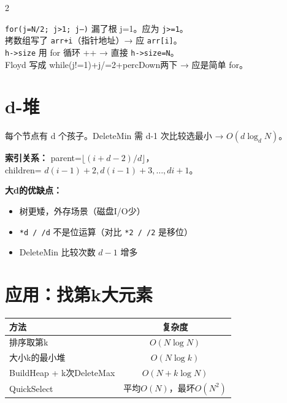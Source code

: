 \documentclass[10pt,a4paper]{article}
\begin{document}
\begin{multicols}{2}
\begin{bugbox}
\texttt{for(j=N/2; j>1; j--)} 漏了根 j=1。应为 \texttt{j>=1}。\\
拷数组写了 \texttt{arr+i}（指针地址）→ 应 \texttt{arr[i]}。\\
\texttt{h->size} 用 for 循环 ++ → 直接 \texttt{h->size=N}。\\
Floyd 写成 while(j!=1)+j/=2+percDown两下 → 应是简单 for。
\end{bugbox}

\section*{d-堆}

每个节点有 d 个孩子。DeleteMin 需 d-1 次比较选最小 → $O(d\log_d N)$。

\textbf{索引关系：} parent=$\lfloor(i+d-2)/d\rfloor$，\\
children= $d(i-1)+2, d(i-1)+3, \dots, di+1$。

\textbf{大d的优缺点：}
\begin{itemize}
\item [+] 树更矮，外存场景（磁盘I/O少）
\item [--] \texttt{*d / /d} 不是位运算（对比 \texttt{*2 / /2} 是移位）
\item [--] DeleteMin 比较次数 $d-1$ 增多
\end{itemize}

\section*{应用：找第k大元素}

\begin{tabular}{|l|c|}
\hline
\textbf{方法} & \textbf{复杂度} \\
\hline
排序取第k & $O(N\log N)$ \\
大小k的最小堆 & $O(N\log k)$ \\
BuildHeap + k次DeleteMax & $O(N + k\log N)$ \\
QuickSelect & 平均$O(N)$，最坏$O(N^2)$ \\
\hline
\end{tabular}

\end{multicols}
\end{document}
